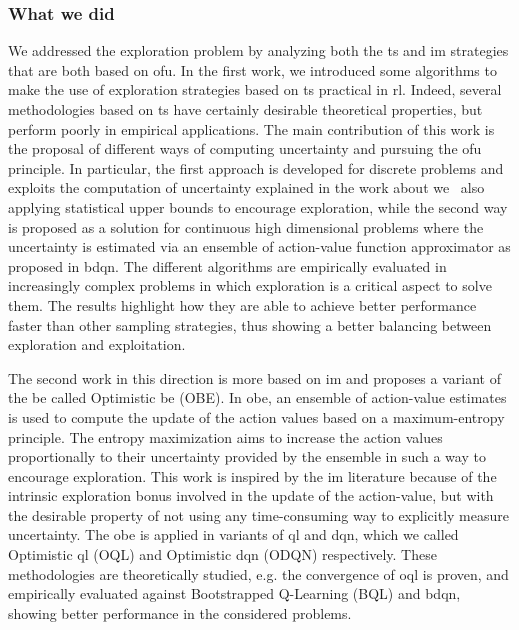 \subsubsection{What we did}
We addressed the exploration problem by analyzing both the \gls{ts} and \gls{im} strategies that are both based on \gls{ofu}. In the first work, we introduced some algorithms to make the use of exploration strategies based on \gls{ts} practical in \gls{rl}. Indeed, several methodologies based on \gls{ts} have certainly desirable theoretical properties, but perform poorly in empirical applications. The main contribution of this work is the proposal of different ways of computing uncertainty and pursuing the \gls{ofu} principle. In particular, the first approach is developed for discrete problems and exploits the computation of uncertainty explained in the work about \gls{we}~\cite{deramo2016estimating} also applying statistical upper bounds to encourage exploration, while the second way is proposed as a solution for continuous high dimensional problems where the uncertainty is estimated via an ensemble of action-value function approximator as proposed in \gls{bdqn}. The different algorithms are empirically evaluated in increasingly complex problems in which exploration is a critical aspect to solve them. The results highlight how they are able to achieve better performance faster than other sampling strategies, thus showing a better balancing between exploration and exploitation.

The second work in this direction is more based on \gls{im} and proposes a variant of the \gls{be} called Optimistic \gls{be} (OBE). In \gls{obe}, an ensemble of action-value estimates is used to compute the update of the action values based on a maximum-entropy principle. The entropy maximization aims to increase the action values proportionally to their uncertainty provided by the ensemble in such a way to encourage exploration. This work is inspired by the \gls{im} literature because of the intrinsic exploration bonus involved in the update of the action-value, but with the desirable property of not using any time-consuming way to explicitly measure uncertainty. The \gls{obe} is applied in variants of \gls{ql} and \gls{dqn}, which we called Optimistic \gls{ql} (OQL) and Optimistic \gls{dqn} (ODQN) respectively. These methodologies are theoretically studied, e.g. the convergence of \gls{oql} is proven, and empirically evaluated against Bootstrapped Q-Learning (BQL) and \gls{bdqn}, showing better performance in the considered problems.

